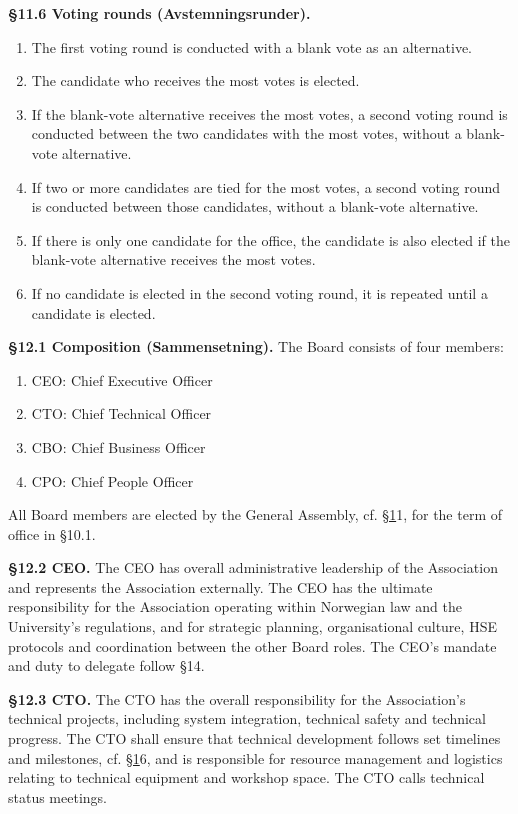 \documentclass{../../../Common/Latex/Templates/rapport}
\begin{document}
\textbf{\S 11.6 Voting rounds (Avstemningsrunder).}\label{bylaw:11.6}
\begin{enumerate}
  \item The first voting round is conducted with a blank vote as an alternative.
  \item The candidate who receives the most votes is elected.
  \item If the blank-vote alternative receives the most votes, a second voting round is conducted between the two candidates with the most votes, without a blank-vote alternative.
  \item If two or more candidates are tied for the most votes, a second voting round is conducted between those candidates, without a blank-vote alternative.
  \item If there is only one candidate for the office, the candidate is also elected if the blank-vote alternative receives the most votes.
  \item If no candidate is elected in the second voting round, it is repeated until a candidate is elected.
\end{enumerate}

\label{bylaw:12}
\textbf{\S 12.1 Composition (Sammensetning).}\label{bylaw:12.1} The Board consists of four members:
\begin{enumerate}
  \item CEO: Chief Executive Officer
  \item CTO: Chief Technical Officer
  \item CBO: Chief Business Officer
  \item CPO: Chief People Officer
\end{enumerate}
All Board members are elected by the General Assembly, cf. \hyperref[bylaw:1]{\S 1}1, for the term of office in \S10.1.

\textbf{\S 12.2 CEO.}\label{bylaw:12.2} The CEO has overall administrative leadership of the Association and represents the Association externally. The CEO has the ultimate responsibility for the Association operating within Norwegian law and the University's regulations, and for strategic planning, organisational culture, HSE protocols and coordination between the other Board roles. The CEO's mandate and duty to delegate follow \S14.

\textbf{\S 12.3 CTO.}\label{bylaw:12.3} The CTO has the overall responsibility for the Association's technical projects, including system integration, technical safety and technical progress. The CTO shall ensure that technical development follows set timelines and milestones, cf. \hyperref[bylaw:1]{\S 1}6, and is responsible for resource management and logistics relating to technical equipment and workshop space. The CTO calls technical status meetings.
\end{document}
